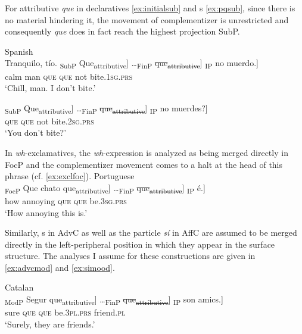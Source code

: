 For attributive \emph{que} in declaratives \eqref{ex:initialsub} and s \eqref{ex:pqsub}, since there is no material hindering it, the movement of complementizer is unrestricted and consequently \emph{que} does in fact reach the highest projection SubP.

\ea 
\ea\label{ex:initialsub}
		Spanish\\
\gll Tranquilo, tío. {\ob}\textsubscript{SubP} Que\textsubscript{attributive}] \dots  {\ob}\textsubscript{FinP} \sout{que\textsubscript{attributive}}] {\ob}\textsubscript{IP} no muerdo.] \\
calm man {} \textsc{que} {} \textsc{que} {} not bite.\textsc{1sg.prs}\\
\glt `Chill, man. I don't bite.'
\ex\label{ex:pqsub}

\gll {\ob}\textsubscript{SubP} Que\textsubscript{attributive}] \dots  {\ob}\textsubscript{FinP} \sout{que\textsubscript{attributive}}] {\ob}\textsubscript{IP} no muerdes?] \\
{} \textsc{que} {} \textsc{que} {} not bite.\textsc{2sg.prs}\\
\glt `You don't bite?'
\z
\z

In \textit{wh}-exclamatives,  the \textit{wh}-expression is analyzed as being merged directly in FocP and the complementizer movement comes to a halt at the head of this phrase (cf. \ref{ex:exclfoc}).
\ea\label{ex:exclfoc}
Portuguese\\ 
\gll {\ob}\textsubscript{FocP} Que chato que\textsubscript{attributive}] \dots  {\ob}\textsubscript{FinP} \sout{que\textsubscript{attributive}}] {\ob}\textsubscript{IP} é.] \\
 {}	how annoying \textsc{que} {}  \textsc{que} {}  be.\textsc{3sg.prs}\\
		\glt `How annoying this is.'
\z

Similarly, s in AdvC as well as the  particle \emph{sí} in AffC are assumed to be merged directly in the left-peripheral position  in which they appear in the surface structure. The analyses I assume for these constructions are given in \eqref{ex:advcmod} and \eqref{ex:simood}. 

\ea \label{ex:advsi}
	\ea\label{ex:advcmod}
	Catalan\\
	\gll {\ob}\textsubscript{ModP} Segur que\textsubscript{attributive}] \dots  {\ob}\textsubscript{FinP} \sout{que\textsubscript{attributive}}] {\ob}\textsubscript{IP} son amics.] \\
		{}	sure \textsc{que} {}  \textsc{que} {}  be.\textsc{3pl.prs} friend.\textsc{pl}\\
		\glt `Surely, they are friends.'
				\ex\label{ex:simood}

